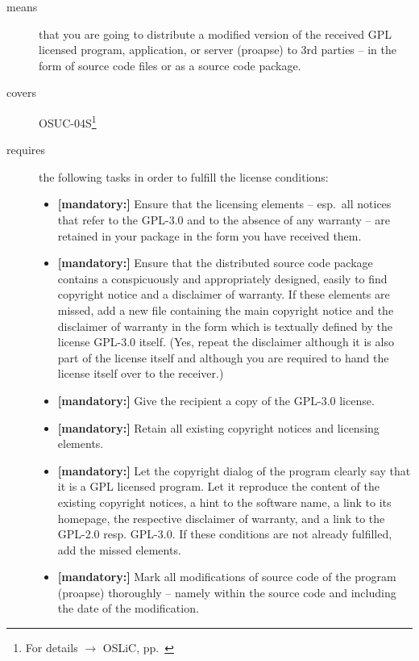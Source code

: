 \begin{description}
\item[means] that you are going to distribute a modified version of the received
GPL licensed program, application, or server (proapse) to 3rd parties -- in the
form of source code files or as a source code package.
\item[covers] OSUC-04S\footnote{For details $\rightarrow$ OSLiC, pp.\
\pageref{OSUC-04S-DEF}}

\item[requires] the following tasks in order to fulfill the license conditions:
\begin{itemize}
  
  \item \textbf{[mandatory:]} Ensure that the licensing elements -- esp.\ all
  notices that refer to the GPL-3.0 and to the absence of any
  warranty -- are retained in your package in the form you have received them.

  \item \textbf{[mandatory:]} Ensure that the distributed source code package
  contains a conspicuously and appropriately designed, easily to find copyright
  notice and a disclaimer of warranty. If these elements are missed, add a new
  file containing the main copyright notice and the disclaimer of warranty in the
  form which is textually defined by the license GPL-3.0 itself. (Yes, repeat
  the disclaimer although it is also part of the license itself and although you
  are required to hand the license itself over to the receiver.)
  
  \item \textbf{[mandatory:]} Give the recipient a copy of the GPL-3.0 license.  
  
  \item \textbf{[mandatory:]} Retain all existing copyright notices and
  licensing elements.
  
  \item \textbf{[mandatory:]} Let the copyright dialog of the program clearly
  say that it is a GPL licensed program. Let it reproduce the content of the
  existing copyright notices, a hint to the software name, a link to its
  homepage, the respective disclaimer of warranty, and a link to the GPL-2.0
  resp. GPL-3.0. If these conditions are not already fulfilled, add the missed
  elements.

  \item \textbf{[mandatory:]} Mark all modifications of source code of the
  program (proapse) thoroughly -- namely within the source code and including
  the date of the modification.
  

\end{itemize}
\end{description}

